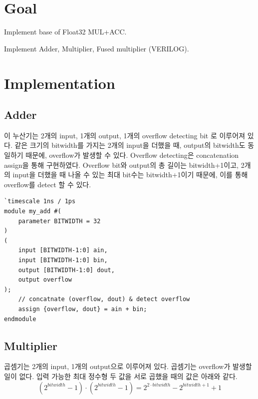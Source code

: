 \documentclass{article}
\begin{document}
\pagestyle{fancy}

\section*{Goal}

\begin{itemize*}
\item Implement base of Float32 MUL+ACC.
\item Implement Adder, Multiplier, Fused multiplier (VERILOG).
\end{itemize*}

\section{Implementation}

\subsection{Adder}

이 누산기는 2개의 input, 1개의 output, 1개의 overflow detecting bit 로 이루어져 있다.
같은 크기의 bitwidth를 가지는 2개의 input을 더했을 때, output의 bitwidth도 동일하기 때문에, overflow가 발생할 수 있다.
Overflow detecting은 concatenation assign을 통해 구현하였다.
Overflow bit와 output의 총 길이는 bitwidth+1이고, 2개의 input을 더했을 때 나올 수 있는 최대 bit수는 bitwidth+1이기 때문에, 이를 통해 overflow를 detect 할 수 있다.

\begin{lstlisting}[style={verilog-style}]
`timescale 1ns / 1ps
module my_add #(
    parameter BITWIDTH = 32
)
(
    input [BITWIDTH-1:0] ain,
    input [BITWIDTH-1:0] bin,
    output [BITWIDTH-1:0] dout,
    output overflow
);
    // concatnate (overflow, dout) & detect overflow
    assign {overflow, dout} = ain + bin;
endmodule
\end{lstlisting}


\subsection{Multiplier}
곱셈기는 2개의 input, 1개의 output으로 이루어져 있다. 곱셈기는 overflow가 발생할 일이 없다.
입력 가능한 최대 정수형 두 값을 서로 곱했을 때의 값은 아래와 같다.
\begin{equation}
\left(2^{bitwidth}-1\right) \cdot \left(2^{bitwidth}-1\right) = 2^{2 \cdot bitwidth}-2^{bitwidth+1}+1
\label{eq1}
\end{equation}
\end{document}
